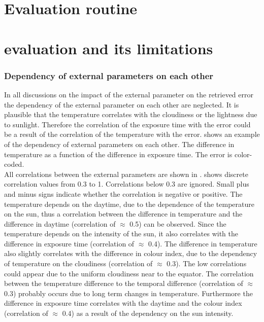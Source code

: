 \documentclass  [
  paper    = a4,
  BCOR     = 10mm,
  twoside,
  fontsize = 12pt,
  fleqn,
  toc      = bibnumbered,
  toc      = listofnumbered,
  numbers  = noendperiod,
  headings = normal,
  listof   = leveldown,
  version  = 3.03
]                                       {scrreprt}
\begin{document}
	
	
	\chapter{Evaluation routine\label{Chap:evalroutine}}
	
	\chapter{  evaluation and its limitations}
	
	

	\subsection*{Dependency of external parameters on each other}
	In all discussions on the impact of the external parameter on the retrieved   error the  dependency of the external parameter on each other are neglected. It is plausible that the temperature correlates with the cloudiness or the lightness due to sunlight. Therefore the correlation of the exposure time with the   error could be a result of the correlation of the temperature with the   error.  shows an example of the dependency of external parameters on each other. The difference in temperature as a function of the difference in exposure time. The   error is color-coded. \\
	All correlations between the external parameters are shown in .  shows discrete correlation values from 0.3 to 1. Correlations below 0.3 are ignored. Small plus and minus signs indicate whether the correlation is negative or positive. 
	The temperature depends on the daytime, due to the dependence of the temperature on the sun, thus a correlation between the  difference in temperature and the difference in daytime (correlation of $\approx$ 0.5) can be observed. Since the temperature depends on the intensity of the sun, it also correlates with  the difference in exposure time (correlation of $\approx$ 0.4). The difference in temperature also slightly correlates with the difference in colour index, due to the dependency of temperature on the cloudiness (correlation of $\approx$ 0.3). The low correlations could appear due to the uniform cloudiness near to the equator. The correlation between the temperature difference to the temporal difference (correlation of $\approx$ 0.3) probably occurs due to long term changes in temperature. Furthermore the difference in exposure time correlates with the daytime and the colour index (correlation of $\approx$ 0.4) as a result of the dependency on the sun intensity.\\
\end{document}
